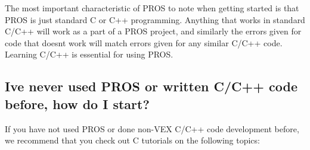 The most important characteristic of P\+R\+OS to note when getting started is that P\+R\+OS is just standard C or C++ programming. Anything that works in standard C/\+C++ will work as a part of a P\+R\+OS project, and similarly the errors given for code that doesn\textquotesingle{}t work will match errors given for any similar C/\+C++ code. Learning C/\+C++ is essential for using P\+R\+OS.

\subsection*{I\textquotesingle{}ve never used P\+R\+OS or written C/\+C++ code before, how do I start?}

If you have not used P\+R\+OS or done non-\/\+V\+EX C/\+C++ code development before, we recommend that you check out C tutorials on the following topics\+:


